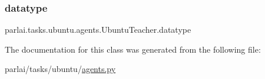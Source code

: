 \subsubsection{\texorpdfstring{datatype}{datatype}}
{\footnotesize\ttfamily parlai.\+tasks.\+ubuntu.\+agents.\+Ubuntu\+Teacher.\+datatype}



The documentation for this class was generated from the following file\+:\begin{DoxyCompactItemize}
\item 
parlai/tasks/ubuntu/\hyperlink{parlai_2tasks_2ubuntu_2agents_8py}{agents.\+py}\end{DoxyCompactItemize}
